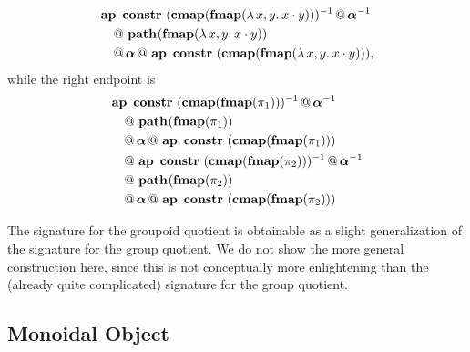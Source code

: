 \begin{itemize}
\begin{itemize}
\begin{align*}
& \hconcat{\hap{\constr}{\hinv{(\hcompconst{\fmap(\Lam {x,y}. x \cdot y)})}}}{\hinv{\hassocN}} \\
& \quad \hconcat{}{\hconstr{}{\fmap(\Lam {x,y}. x \cdot y)}} \\
& \quad \hconcat{}{\hconcat{\hassocN}{\hap{\constr}{(\hcompconst{\fmap(\Lam {x,y}. x \cdot y)})}}},
\end{align*}
while the right endpoint is
\begin{align*}
& \operatorname{\mathbf{ap}} \ \operatorname{\mathbf{constr}} \ (\operatorname{\mathbf{cmap}}(\operatorname{\mathbf{fmap}}(\pi_1)))^{-1} \, @ \, 
\boldsymbol\alpha^{-1} \\
& \quad \, @ \, \operatorname{\mathbf{path}}_{}(\operatorname{\mathbf{fmap}}(\pi_1)) \\
& \quad \, @ \, \boldsymbol\alpha \, @ \, \operatorname{\mathbf{ap}} \ \operatorname{\mathbf{constr}} \ (\operatorname{\mathbf{cmap}}(\operatorname{\mathbf{fmap}}(\pi_1))) \\
& \quad \, @ \, \operatorname{\mathbf{ap}} \ \operatorname{\mathbf{constr}} \ (\operatorname{\mathbf{cmap}}(\operatorname{\mathbf{fmap}}(\pi_2)))^{-1} \, @ \, \boldsymbol\alpha^{-1} \\
& \quad \, @ \, \operatorname{\mathbf{path}}_{}(\operatorname{\mathbf{fmap}}(\pi_2)) \\
& \quad \, @ \, \boldsymbol\alpha \, @ \, \operatorname{\mathbf{ap}} \ \operatorname{\mathbf{constr}} \ (\operatorname{\mathbf{cmap}}(\operatorname{\mathbf{fmap}}(\pi_2)))
\end{align*}
\end{itemize}
\end{itemize}

The signature for the groupoid quotient is obtainable as a slight
generalization of the signature for the group quotient. We do not show
the more general construction here, since this is not conceptually
more enlightening than the (already quite complicated) signature for
the group quotient.

\subsection{Monoidal Object}
\label{sec:monoidal_object}


